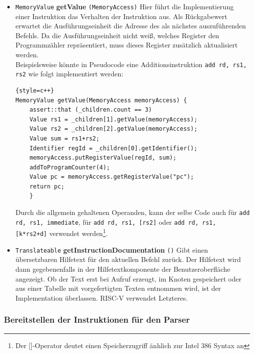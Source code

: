 \begin{itemize}
	\item \texttt{MemoryValue} \textbf{getValue} \texttt{(MemoryAccess)}
	Hier führt die Implementierung einer Instruktion das Verhalten der Instruktion aus. Als Rückgabewert erwartet die Ausführungseinheit die Adresse des als nächstes auszuführenden Befehls. Da die Ausführungseinheit nicht weiß, welches Register den Programmzähler repräsentiert, muss dieses Register zusätzlich aktualisiert werden. \\
	Beispielsweise könnte in Pseudocode eine Additionsinstruktion \texttt{add rd, rs1, rs2} wie folgt implementiert werden:
\begin{lstlisting}{style=c++}
MemoryValue getValue(MemoryAccess memoryAccess) {
	assert::that (_children.count == 3)
	Value rs1 = _children[1].getValue(memoryAccess);
	Value rs2 = _children[2].getValue(memoryAccess);
	Value sum = rs1+rs2;
	Identifier regId = _children[0].getIdentifier();
	memoryAccess.putRegisterValue(regId, sum);
	addToProgramCounter(4);
	Value pc = memoryAccess.getRegisterValue("pc");
	return pc;
	}
\end{lstlisting}
	Durch die allgemein gehaltenen Operanden, kann der selbe Code auch für \texttt{add rd, rs1, immediate}, für \texttt{add rd, rs1, [rs2]} oder \texttt{add rd, rs1, [k*rs2+d]} verwendet werden\footnote{Der []-Operator deutet einen Speicherzugriff änhlich zur Intel 386 Syntax an}.
	\item \texttt{Translateable} \textbf{getInstructionDocumentation} \texttt{()}
	Gibt einen übersetzbaren Hilfetext für den aktuellen Befehl zurück. Der Hilfetext wird dann gegebenenfalls in der Hilfetextkomponente der Benutzeroberfläche angezeigt. Ob der Text erst bei Aufruf erzeugt, im Knoten gespeichert oder aus einer Tabelle mit vorgefertigten Texten entnommen wird, ist der Implementation überlassen. RISC-V verwendet Letzteres.
\end{itemize}

\subsubsection{Bereitstellen der Instruktionen für den Parser}
\label{extension-arch-factories}

